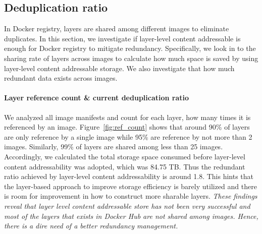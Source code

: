 \subsection{Deduplication ratio} \label{sec:dedup_ratio}



In Docker registry, layers are shared among different images to eliminate
duplicates.  In this section, we investigate if layer-level content addressable
is enough for Docker registry to mitigate redundancy.  Specifically, we look in
to the sharing rate of layers across images to calculate how much space is
saved by using layer-level content addressable storage.  We also investigate
that how much redundant data exists across images.

\paragraph{Layer reference count \& current deduplication ratio}



We analyzed all image manifests and count for each layer, how many times it is
referenced by an image.
%
Figure~\ref{fig:ref_count} shows that around 90\% of layers are only reference
by a single image while 95\% are reference by not more than 2 images.
%
Similarly, 99\% of layers are shared among less than 25 images. 
%
Accordingly, we calculated the total storage space consumed before layer-level
content addressability was adopted, which was 84.75 TB.  Thus the redundant
ratio achieved by layer-level content addressability is around 1.8.
%
This hints that the layer-based approach to improve storage efficiency is
barely utilized and there is room for improvement in how to construct more
sharable layers.
%
\emph{These findings reveal that layer level content addressable store has not
been very successful and most of the layers that exists in Docker Hub are not
shared among images.
	Hence, there is a dire need of a better redundancy management.}

